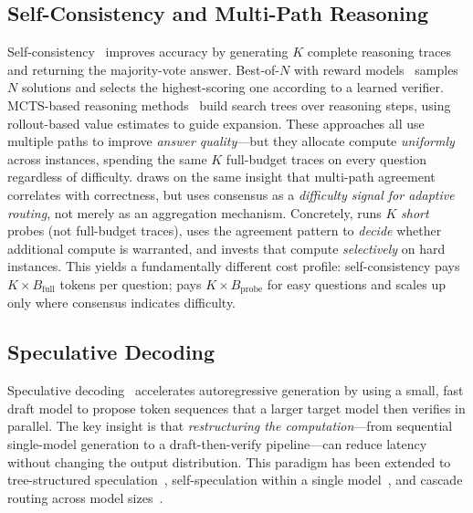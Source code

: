 \subsection{Self-Consistency and Multi-Path Reasoning}
\label{sec:related:sc}

Self-consistency~\citep{wang2023selfconsistency} improves accuracy by generating $K$ complete reasoning traces and returning the majority-vote answer.
Best-of-$N$ with reward models~\citep{cobbe2021gsm8k,lightman2023prm} samples $N$ solutions and selects the highest-scoring one according to a learned verifier.
MCTS-based reasoning methods~\citep{hao2023reasoning,xie2024selfevaluation,qi2024mutual} build search trees over reasoning steps, using rollout-based value estimates to guide expansion.
These approaches all use multiple paths to improve \emph{answer quality}---but they allocate compute \emph{uniformly} across instances, spending the same $K$ full-budget traces on every question regardless of difficulty.
\method{} draws on the same insight that multi-path agreement correlates with correctness, but uses consensus as a \emph{difficulty signal for adaptive routing}, not merely as an aggregation mechanism.
Concretely, \method{} runs $K$ \emph{short} probes (not full-budget traces), uses the agreement pattern to \emph{decide} whether additional compute is warranted, and invests that compute \emph{selectively} on hard instances.
This yields a fundamentally different cost profile: self-consistency pays $K \times B_{\mathrm{full}}$ tokens per question; \method{} pays $K \times B_{\mathrm{probe}}$ for easy questions and scales up only where consensus indicates difficulty.

\subsection{Speculative Decoding}
\label{sec:related:spec}

Speculative decoding~\citep{leviathan2023fast,chen2023accelerating} accelerates autoregressive generation by using a small, fast draft model to propose token sequences that a larger target model then verifies in parallel.
The key insight is that \emph{restructuring the computation}---from sequential single-model generation to a draft-then-verify pipeline---can reduce latency without changing the output distribution.
This paradigm has been extended to tree-structured speculation~\citep{miao2024specinfer}, self-speculation within a single model~\citep{zhang2024draft}, and cascade routing across model sizes~\citep{chen2023frugalgpt}.

